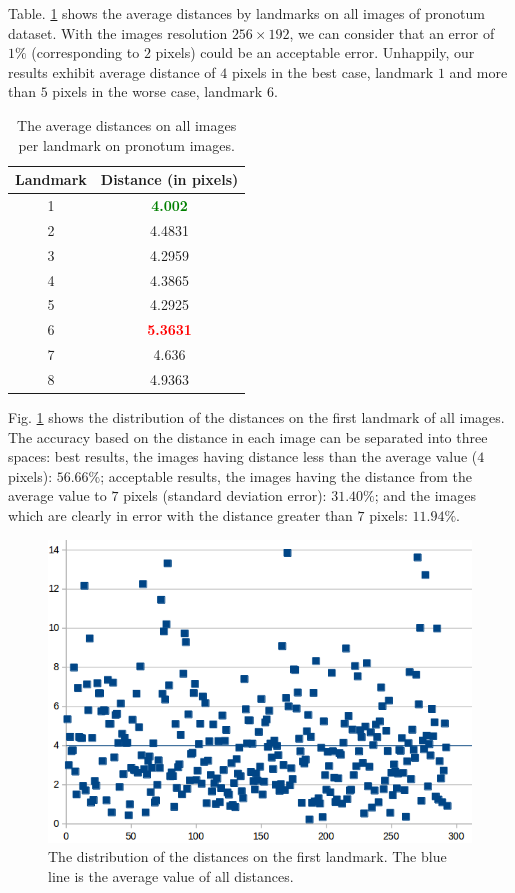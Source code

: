 \documentclass[review]{elsarticle}
\begin{document}
Table. \ref{tblavgpronotum} shows the average distances by landmarks on all images of pronotum dataset. With the images resolution $256 \times 192$, we can consider that an error of $1\%$ (corresponding to $2$ pixels) could
be an acceptable error. Unhappily, our results exhibit average
distance of $4$ pixels in the best case, landmark $1$ and more than
$5$ pixels in the worse case, landmark $6$.

\begin{table}[htbp]
	\centering	
	\begin{tabular}{|c|c|}
		\hline
		\textbf{Landmark} & \textbf{Distance} (in pixels) \\ \hline
		1 & \textcolor{green}{\textbf{4.002}}  \\ \hline
		2 & 4.4831 \\ \hline
		3 & 4.2959 \\ \hline
		4 & 4.3865 \\ \hline
		5 & 4.2925 \\ \hline
		6 & \textcolor{red}{\textbf{5.3631}} \\ \hline
		7 & 4.636 \\ \hline
		8 & 4.9363 \\ \hline
	\end{tabular}
	\caption{The average distances on all images per landmark on pronotum images.}
	\label{tblavgpronotum}
\end{table}

Fig. \ref{figchartlm1} shows the distribution of the distances on the first landmark of all images. The accuracy based on the distance in each image can be
separated into three spaces: best results, the images having distance less
than the average value ($4$ pixels): $56.66\%$; acceptable results, the images having the
distance from the average value to $7$ pixels (standard deviation error): $31.40\%$; and the images which are clearly in error with the distance greater than $7$ pixels: $11.94\%$.

\begin{figure}[htbp]
	\centerline{\includegraphics[scale=0.3]{images/statistic_pronotum_from_scratch_lm1}}
	\caption{The distribution of the distances on the first landmark. The blue line is the average value of all distances.}
	\label{figchartlm1}
\end{figure}
\end{document}
